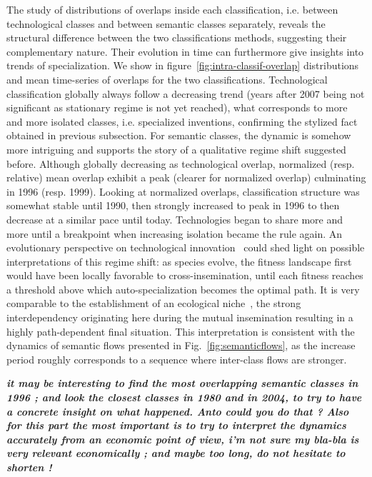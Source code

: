 \documentclass[10pt,A4]{article}
\newcommand{\todo}[1]{\textcolor{red!50!blue}{\textbf{\textit{#1}}}}
\begin{document}
The study of distributions of overlaps inside each classification, i.e. between technological classes and between semantic classes separately, reveals the structural difference between the two classifications methods, suggesting their complementary nature. Their evolution in time can furthermore give insights into trends of specialization. We show in figure~\ref{fig:intra-classif-overlap} distributions and mean time-series of overlaps for the two classifications. Technological classification globally always follow a decreasing trend (years after 2007 being not significant as stationary regime is not yet reached), what corresponds to more and more isolated classes, i.e. specialized inventions, confirming the stylized fact obtained in previous subsection. For semantic classes, the dynamic is somehow more intriguing and supports the story of a qualitative regime shift suggested before. Although globally decreasing as technological overlap, normalized (resp. relative) mean overlap exhibit a peak (clearer for normalized overlap) culminating in 1996 (resp. 1999). Looking at normalized overlaps, classification structure was somewhat stable until 1990, then strongly increased to peak in 1996 to then decrease at a similar pace until today. Technologies began to share more and more until a breakpoint when increasing isolation became the rule again. An evolutionary perspective on technological innovation~\cite{ziman2003technological} could shed light on possible interpretations of this regime shift: as species evolve, the fitness landscape first would have been locally favorable to cross-insemination, until each fitness reaches a threshold above which auto-specialization becomes the optimal path. It is very comparable to the establishment of an ecological niche~\cite{holland2012signals}, the strong interdependency originating here during the mutual insemination resulting in a highly path-dependent final situation. This interpretation is consistent with the dynamics of semantic flows presented in Fig.~\ref{fig:semanticflows}, as the increase period roughly corresponds to a sequence where inter-class flows are stronger.


\todo{it may be interesting to find the most overlapping semantic classes in 1996 ; and look the closest classes in 1980 and in 2004, to try to have a concrete insight on what happened. Anto could you do that ? Also for this part the most important is to try to interpret the dynamics accurately from an economic point of view, i'm not sure my bla-bla is very relevant economically ; and maybe too long, do not hesitate to shorten !} 
\end{document}
